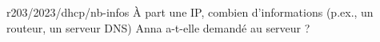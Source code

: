 \begin{question}{r203/2023/dhcp/nb-infos}
  À part une IP, combien d'informations (p.ex., un routeur, un serveur
  DNS) Anna a-t-elle demandé au serveur ?
  \begin{reponses}
  \end{reponses}
\end{question}
